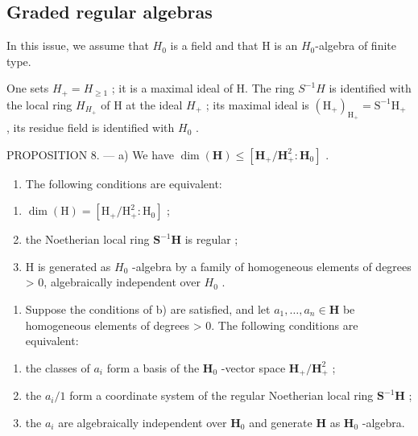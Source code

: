 \subsection{Graded regular algebras}

In this issue, we assume that \(H_{0}\) is a field and that H is an \(H_{0}\)-algebra of finite type.

One sets \(H_{+} = H_{\geqslant 1}\) ; it is a maximal ideal of H. The ring \(S^{-1}H\) is identified with the local ring \(H_{H_{+}}\) of H at the ideal \(H_{+}\) ; its maximal ideal is \((\mathrm{H}_{+})_{\mathrm{H}_{+}} = \mathrm{S}^{-1}\mathrm{H}_{+}\) , its residue field is identified with \(H_{0}\) .

PROPOSITION 8. --- a) We have \(\dim(\mathbf{H}) \leqslant [\mathbf{H}_{+}/\mathbf{H}_{+}^{2}:\mathbf{H}_{0}]\) .

\begin{enumerate}
\def\labelenumi{\alph{enumi})}
\setcounter{enumi}{1}
\tightlist
\item
  The following conditions are equivalent:
\end{enumerate}

\begin{enumerate}
\def\labelenumi{(\roman{enumi})}
\item
  \(\dim (\mathrm{H}) = [\mathrm{H}_{+} / \mathrm{H}_{+}^{2}:\mathrm{H}_{0}]\) ;
\item
  the Noetherian local ring \(\mathbf{S}^{-1}\mathbf{H}\) is regular ;
\item
  H is generated as \(H_{0}\) -algebra by a family of homogeneous elements of degrees \textgreater{} 0, algebraically independent over \(H_{0}\) .
\end{enumerate}

\begin{enumerate}
\def\labelenumi{\alph{enumi})}
\setcounter{enumi}{2}
\tightlist
\item
  Suppose the conditions of b) are satisfied, and let \(a_{1}, \ldots, a_{n} \in \mathbf{H}\) be homogeneous elements of degrees \textgreater{} 0. The following conditions are equivalent:
\end{enumerate}

\begin{enumerate}
\def\labelenumi{(\roman{enumi})}
\item
  the classes of \(a_{i}\) form a basis of the \(\mathbf{H}_{0}\) -vector space \(\mathbf{H}_{+}/\mathbf{H}_{+}^{2}\) ;
\item
  the \(a_{i}/1\) form a coordinate system of the regular Noetherian local ring \(\mathbf{S}^{-1}\mathbf{H}\) ;
\item
  the \(a_{i}\) are algebraically independent over \(\mathbf{H}_{0}\) and generate \(\mathbf{H}\) as \(\mathbf{H}_{0}\) -algebra.
\end{enumerate}


